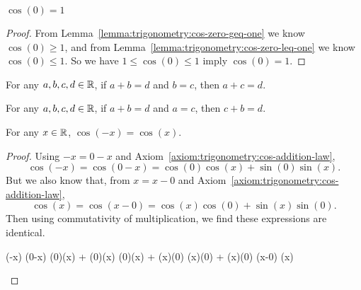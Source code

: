 \begin{proposition}\label{prop:trigonometry:cos-of-zero-is-one}
$\cos(0) = 1$
\end{proposition}
\begin{proof}
  From Lemma~\ref{lemma:trigonometry:cos-zero-geq-one} we know
  $\cos(0)\geq1$, and from
  Lemma~\ref{lemma:trigonometry:cos-zero-leq-one} we know
  $\cos(0)\leq1$. So we have $1\leq\cos(0)\leq1$ imply $\cos(0)=1$.
\end{proof}

\begin{lemma}\label{lemma:equality:substitute-summand-for-equal-term}
For any $a,b,c,d\in\mathbb{R}$, if $a+b=d$ and $b=c$, then $a+c=d$.
\end{lemma}

\begin{lemma}\label{lemma:equality:substitute-left-summand-for-equal-term}
For any $a,b,c,d\in\mathbb{R}$, if $a+b=d$ and $a=c$, then $c+b=d$.
\end{lemma}

\begin{proposition}\label{prop:cosine-is-even}
For any $x\in\mathbb{R}$, $\cos(-x) = \cos(x)$.
\end{proposition}
\begin{proof}
Using $-x=0-x$ and Axiom~\ref{axiom:trigonometry:cos-addition-law},
\begin{equation}
\cos(-x) = \cos(0 - x) = \cos(0)\cos(x) + \sin(0)\sin(x).
\end{equation}
But we also know that, from $x=x-0$ and Axiom~\ref{axiom:trigonometry:cos-addition-law},
\begin{equation}
\cos(x) = \cos(x - 0) = \cos(x)\cos(0) + \sin(x)\sin(0).
\end{equation}
Then using commutativity of multiplication, we find these expressions
are identical.
\begin{calculation}
  \cos(-x)
  \cos(0-x)
  \cos(0)\cos(x) + \sin(0)\sin(x)
  \cos(0)\cos(x) + \sin(x)\sin(0)
  \cos(x)\cos(0) + \sin(x)\sin(0)
  \cos(x-0)
  \cos(x)\qedhere
\end{calculation}
\end{proof}

